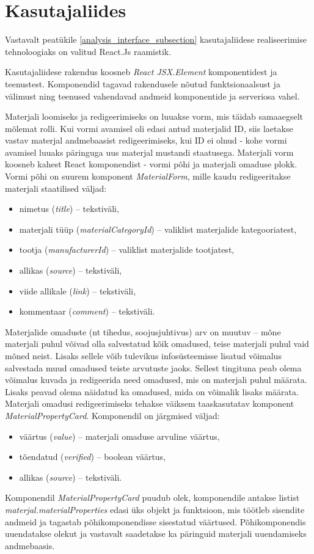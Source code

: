 \section{Kasutajaliides}
Vastavalt peatükile \ref{analysis_interface_subsection} kasutajaliidese realiseerimise tehnoloogiaks
on valitud React.Js raamistik.

Kasutajaliidese rakendus koosneb \textit{React JSX.Element} komponentidest ja teenustest.
Komponendid tagavad rakendusele nõutud funktsionaalsust ja välimust ning teenused vahendavad andmeid komponentide 
ja serveriosa vahel.

Materjali loomiseks ja redigeerimiseks on luuakse vorm, mis täidab samaaegselt mõlemat rolli. 
Kui vormi avamisel oli edasi antud materjalid ID, siis laetakse vastav materjal andmebaasist redigeerimiseks, 
kui ID ei olnud - kohe vormi avamisel luuaks päringuga uus materjal mustandi staatusega.
Materjali vorm koosneb kahest React komponendist - vormi põhi ja materjali omaduse plokk.
Vormi põhi on suurem komponent \textit{MaterialForm}, mille kaudu redigeeritakse materjali staatilised 
väljad:

\begin{itemize}
    \item nimetus (\textit{title}) -- tekstiväli,
    \item materjali tüüp (\textit{materialCategoryId}) -- valiklist materjalide kategooriatest, 
    \item tootja (\textit{manufacturerId}) -- valiklist materjalide tootjatest,
    \item allikas (\textit{source}) -- tekstiväli,
    \item viide allikale (\textit{link}) -- tekstiväli,
    \item kommentaar (\textit{comment}) -- tekstiväli.
\end{itemize}

Materjalide omaduste (nt tihedus, soojusjuhtivus) arv on muutuv -- mõne materjali puhul võivad olla salvestatud
kõik omadused, teise materjali puhul vaid mõned neist. Lisaks sellele võib tulevikus infosüsteemisse lisatud
võimalus salvestada muud omadused teiste arvutuste jaoks. Sellest tingituna peab olema võimalus kuvada
ja redigeerida need omadused, mis on materjali puhul määrata. Lisaks peavad olema näidatud ka omadused,
mida on võimalik lisaks määrata. Materjali omadusi redigeerimiseks tehakse väiksem taaskasutatav 
komponent \textit{MaterialPropertyCard}. Komponendil on järgmised väljad:
\begin{itemize}
    \item väärtus (\textit{value}) -- materjali omaduse arvuline väärtus,
    \item tõendatud (\textit{verified}) -- boolean väärtus,
    \item allikas (\textit{source}) -- tekstiväli.
\end{itemize}

Komponendil \textit{MaterialPropertyCard} puudub olek, komponendile antakse listist 
\textit{materjal.materialProperties} edasi üks objekt ja funktsioon, mis töötleb sisendite andmeid
ja tagastab põhikomponendisse sisestatud väärtused. Põhikomponendis uuendatakse olekut ja vastavalt
saadetakse ka päringuid materjali uuendamiseks andmebaasis.